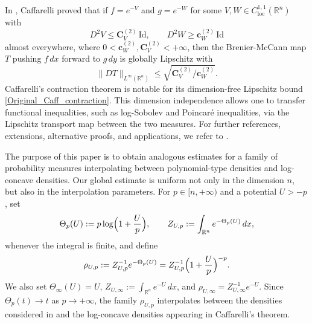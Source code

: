 \documentclass[11pt,a4paper,reqno]{amsart}
\numberwithin{equation}{section}
\theoremstyle{definition}
\newcommand{\<}{\ensuremath \leq}
\renewcommand{\>}{\ensuremath \geq}
\newcommand{\ThetaPar}{\Theta}
\newcommand{\Znorm}[2]{Z_{#1,#2}}
\newcommand{\CV}{\mathbf{C}_V}
\newcommand{\cW}{\mathbf{c}_W}
\begin{document}
In \cite{Caff}, Caffarelli proved that if $f=e^{-V}$ and $g=e^{-W}$ for some $V,W \in C_{\mathrm{loc}}^{1,1}(\mathbb{R}^n)$ with
\[
    D^2V \le \CV^{(2)}\,\mathrm{Id}, \qquad D^2W \ge \cW^{(2)}\,\mathrm{Id}
\]
almost everywhere, where $0<\cW^{(2)},\CV^{(2)}<+\infty$, then the Brenier-McCann map $T$ pushing $f\,dx$ forward to $g\,dy$ is globally Lipschitz with
\begin{equation}\label{Original_Caff_contraction}
    \|DT\|_{L^\infty(\mathbb{R}^n)}\le \sqrt{\CV^{(2)}/\cW^{(2)}}.
\end{equation}
Caffarelli's contraction theorem is notable for its dimension-free Lipschitz bound \cref{Original_Caff_contraction}. This dimension independence allows one to transfer functional inequalities, such as log-Sobolev and Poincaré inequalities, via the Lipschitz transport map between the two measures. For further references, extensions, alternative proofs, and applications, we refer to \cite{Kolesnikov,Kim_Milman,Jhaveri_Colombo,Vald,Colombo_Fathi,DePHilippis_Shenfeld}.

The purpose of this paper is to obtain analogous estimates for a family of probability measures interpolating between polynomial-type densities and log-concave densities. Our global estimate is uniform not only in the dimension $n$, but also in the interpolation parameters. For $p\in[n,+\infty)$ and a potential $U>-p$, set
\[
    \ThetaPar_p(U):=p\log\Bigl(1+\frac{U}{p}\Bigr), \qquad
    \Znorm{U}{p}:=\int_{\mathbb{R}^n}e^{-\ThetaPar_p(U)}\,dx,
\]
whenever the integral is finite, and define
\[
    \rho_{U,p}:=\Znorm{U}{p}^{-1}e^{-\ThetaPar_p(U)}
    =\Znorm{U}{p}^{-1}\Bigl(1+\frac{U}{p}\Bigr)^{-p}.
\]
We also set $\ThetaPar_{\infty}(U)=U$, $\Znorm{U}{\infty}:=\int_{\mathbb{R}^n}e^{-U}\,dx$, and $\rho_{U,\infty}=\Znorm{U}{\infty}^{-1}e^{-U}$. Since $\ThetaPar_p(t)\to t$ as $p\to+\infty$, the family $\rho_{U,p}$ interpolates between the densities considered in \cite{Alessio_Carlier_Santa,Fathi} and the log-concave densities appearing in Caffarelli's theorem.
\end{document}

